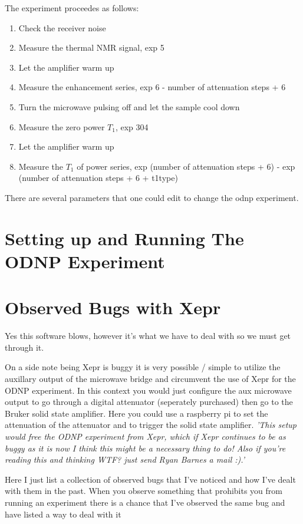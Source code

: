 \documentclass{article}
\newcommand{\fc}[1]{{\color{blue}\textit{'{#1}'}}}
\begin{document}
The experiment proceedes as follows:
\begin{enumerate}
	\item{Check the receiver noise}
	\item{Measure the thermal NMR signal, exp 5}
	\item{Let the amplifier warm up}
	\item{Measure the enhancement series, exp 6 - number of attenuation steps + 6}
	\item{Turn the microwave pulsing off and let the sample cool down}
	\item{Measure the zero power $T_1$, exp 304}
	\item{Let the amplifier warm up}
	\item{Measure the $T_1$ of power series, exp (number of attenuation steps + 6) - exp (number of attenuation steps + 6 + t1type)}
\end{enumerate}

There are several parameters that one could edit to change the odnp experiment.



\section{Setting up and Running The ODNP Experiment}
\label{sec:runningODNP}



\section{Observed Bugs with Xepr}
Yes this software blows, however it's what we have to deal with so we must get through it.

On a side note being Xepr is buggy it is very possible / simple to utilize the auxillary output of the microwave bridge and circumvent the use of Xepr for the ODNP experiment. In this context you would just configure the aux microwave output to go through a digital attenuator (seperately purchased) then go to the Bruker solid state amplifier. Here you could use a raspberry pi to set the attenuation of the attenuator and to trigger the solid state amplifier. \fc{This setup would free the ODNP experiment from Xepr, which if Xepr continues to be as buggy as it is now I think this might be a necessary thing to do! Also if you're reading this and thinking WTF? just send Ryan Barnes a mail :).}

Here I just list a collection of observed bugs that I've noticed and how I've dealt with them in the past. When you observe something that prohibits you from running an experiment there is a chance that I've observed the same bug and have listed a way to deal with it 
\end{document}
